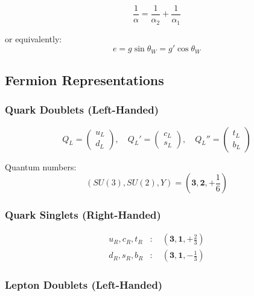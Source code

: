 \begin{equation}
\label{eq:canonical:em_coupling}
\frac{1}{\alpha} = \frac{1}{\alpha_2} + \frac{1}{\alpha_1}
\end{equation}

or equivalently:
\begin{equation}
e = g \sin\theta_W = g' \cos\theta_W
\end{equation}

\subsection{Fermion Representations}

\subsubsection{Quark Doublets (Left-Handed)}

\begin{equation}
Q_L = \begin{pmatrix} u_L \\ d_L \end{pmatrix}, \quad
Q_L' = \begin{pmatrix} c_L \\ s_L \end{pmatrix}, \quad
Q_L'' = \begin{pmatrix} t_L \\ b_L \end{pmatrix}
\end{equation}

Quantum numbers:
\begin{equation}
(SU(3), SU(2), Y) = (\mathbf{3}, \mathbf{2}, +\frac{1}{6})
\end{equation}

\subsubsection{Quark Singlets (Right-Handed)}

\begin{align}
u_R, c_R, t_R &: \quad (\mathbf{3}, \mathbf{1}, +\frac{2}{3}) \\
d_R, s_R, b_R &: \quad (\mathbf{3}, \mathbf{1}, -\frac{1}{3})
\end{align}

\subsubsection{Lepton Doublets (Left-Handed)}

